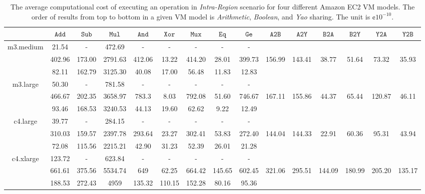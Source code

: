 \documentclass{llncs}
\begin{document}
\begin{table*}[hbt]
	\scriptsize
	\centering
	\begin{tabular}{|c|c|c|c|c|c|c|c|c|c|c|c|c|c|c|}
	
	\cline{2-15}
	 \multicolumn{1}{c|}{} & $\mathtt{Add}$ & $\mathtt{Sub}$ & $\mathtt{Mul}$ & $\mathtt{And}$ & $\mathtt{Xor}$ & $\mathtt{Mux}$ & $\mathtt{Eq}$ & $\mathtt{Ge}$ & $\mathtt{A2B}$ & $\mathtt{A2Y}$ & $\mathtt{B2A}$ & $\mathtt{B2Y}$ & $\mathtt{Y2A}$ & $\mathtt{Y2B}$ \\
	\hline

	\multirow{3}{*}{m3.medium}
		& 21.54 	& - 		& 472.69 	& - 		& - 		& - 		& - 		& - 									&  	&  	&  	&  	&  	&  \\
		& 402.96 	& 173.00 	& 2791.63 	& 412.06 	& 13.22 	& 414.20 	& 28.01 	& 399.73 	& 156.99 	& 143.41 	& 38.77 	& 51.64 	& 73.32 	& 35.93 \\
		& 82.11 	& 162.79 	& 3125.30 	& 40.08 	& 17.00 	& 56.48 	& 11.83 	& 12.83 	&  	&  	&  	&  	&  	&   \\
	\hline

	\multirow{3}{*}{m3.large}
		& 50.30	& -		& 781.58	& - 		& - 		& - 		& - 		& - 							&  	&  	&  	&  	&  	&  \\
		& 466.67	& 202.35	& 3658.97	& 783.3	& 8.03	& 792.08	& 51.60	& 746.67	& 167.11	& 155.86	& 44.37	& 65.44	& 120.87	& 46.11 \\
		& 93.46	& 168.53	& 3240.53	& 44.13	& 19.60	& 62.62	& 9.22	& 12.49				&  	&  	&  	&  	&  	&  \\
	\hline		

	\multirow{3}{*}{c4.large}
		& 39.77	& -		& 284.15	& -		& -		& -		& -		& -		&  	&  	&  	&  	&  	&  \\
		& 310.03	& 159.57	& 2397.78	& 293.64	& 23.27	& 302.41	& 53.83	& 272.40	& 144.04	& 144.33 	& 22.91	& 60.36	& 95.31	& 43.94 \\
		& 72.08	& 115.56	& 2215.21	& 42.90	& 31.23	& 52.39	& 26.01	& 21.28	&  	&  	&  	&  	&  	&  \\
	\hline

	\multirow{3}{*}{c4.xlarge}
		& 123.72	& -		& 623.84	& -		& -		& -		& -		& -											&  	&  	&  	&  	&  	&  \\
		& 661.61	& 375.56 	& 5534.74	& 649	& 62.25	& 664.42	& 145.65	& 602.45	& 321.06	& 295.51 	& 144.09	& 180.99	& 205.20	& 135.17 \\
		& 188.53	& 272.43 	& 4959	& 135.32	& 110.15	& 152.28	& 80.16	& 95.36	&  	&  	&  	&  	&  	&  \\
	\hline
	\end{tabular}

	\caption{The average computational cost of executing an operation in \emph{Intra-Region} scenario for four different Amazon EC2 VM models. The order of results from top to bottom in a given VM model is \emph{Arithmetic}, \emph{Boolean}, and \emph{Yao} sharing. The unit is $\cent10^{-10}$.}
	\label{table:cost:local_computation}
\end{table*}
\end{document}
